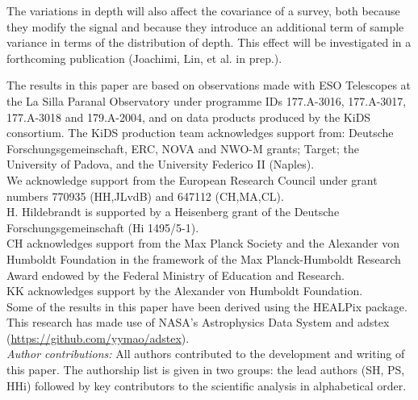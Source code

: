 \documentclass{aa}
\begin{document}
The variations in depth will also affect the covariance of a survey, both because they modify the signal and because they introduce an additional term of sample variance in terms of the distribution of depth. This effect will be investigated in a forthcoming publication (Joachimi, Lin, et al. in prep.).



\begin{acknowledgements}
The results in this paper are based on observations made with ESO Telescopes at the La Silla Paranal Observatory under programme IDs 177.A-3016, 177.A-3017, 177.A-3018 and 179.A-2004, and on data products produced by the KiDS consortium. The KiDS production team acknowledges support from: Deutsche Forschungsgemeinschaft, ERC, NOVA and NWO-M grants; Target; the University of Padova, and the University Federico II (Naples).
\\
We acknowledge support from the European Research Council under grant numbers 770935 (HH,JLvdB) and 647112 (CH,MA,CL).
\\
H. Hildebrandt is supported by a Heisenberg grant of the Deutsche Forschungsgemeinschaft (Hi 1495/5-1).
\\
CH acknowledges support from the Max Planck Society and the Alexander von Humboldt Foundation in the framework of the Max Planck-Humboldt Research Award endowed by the Federal Ministry of Education and Research. 
\\
KK acknowledges support by the Alexander von Humboldt Foundation.
\\
Some of the results in this paper have been derived using the HEALPix \citep{2005ApJ...622..759G} package.
\\
This research has made use of NASA's Astrophysics Data System and adstex (\url{https://github.com/yymao/adstex}).
\\
\emph{Author contributions:} All authors contributed to the development and writing of this paper. The authorship list is given in two groups: the lead authors (SH, PS, HHi) followed by key contributors to the scientific analysis in alphabetical order.
\end{acknowledgements}
\end{document}
